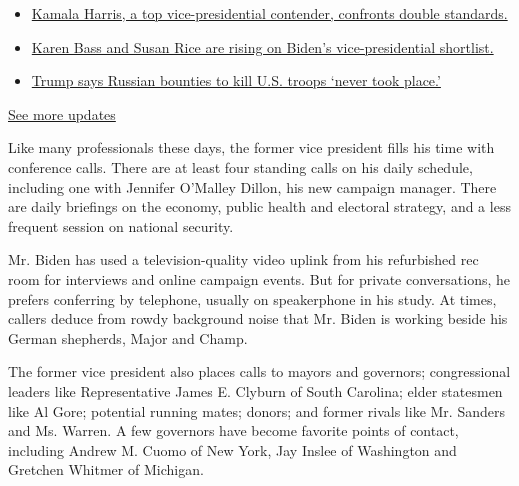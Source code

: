 \begin{itemize}
\tightlist
\item
  \href{https://www.nytimes.com/2020/07/31/us/elections/biden-vs-trump.html?action=click\&pgtype=Article\&state=default\&region=MAIN_CONTENT_1\&context=storylines_live_updates\#link-29fdff45}{Kamala
  Harris, a top vice-presidential contender, confronts double
  standards.}
\item
  \href{https://www.nytimes.com/2020/07/31/us/elections/biden-vs-trump.html?action=click\&pgtype=Article\&state=default\&region=MAIN_CONTENT_1\&context=storylines_live_updates\#link-13ec3d9c}{Karen
  Bass and Susan Rice are rising on Biden's vice-presidential
  shortlist.}
\item
  \href{https://www.nytimes.com/2020/07/31/us/elections/biden-vs-trump.html?action=click\&pgtype=Article\&state=default\&region=MAIN_CONTENT_1\&context=storylines_live_updates\#link-49e9a016}{Trump
  says Russian bounties to kill U.S. troops `never took place.'}
\end{itemize}

\href{https://www.nytimes.com/2020/07/31/us/elections/biden-vs-trump.html?action=click\&pgtype=Article\&state=default\&region=MAIN_CONTENT_1\&context=storylines_live_updates}{See
more updates}

Like many professionals these days, the former vice president fills his
time with conference calls. There are at least four standing calls on
his daily schedule, including one with Jennifer O'Malley Dillon, his new
campaign manager. There are daily briefings on the economy, public
health and electoral strategy, and a less frequent session on national
security.

Mr. Biden has used a television-quality video uplink from his
refurbished rec room for interviews and online campaign events. But for
private conversations, he prefers conferring by telephone, usually on
speakerphone in his study. At times, callers deduce from rowdy
background noise that Mr. Biden is working beside his German shepherds,
Major and Champ.

The former vice president also places calls to mayors and governors;
congressional leaders like Representative James E. Clyburn of South
Carolina; elder statesmen like Al Gore; potential running mates; donors;
and former rivals like Mr. Sanders and Ms. Warren. A few governors have
become favorite points of contact, including Andrew M. Cuomo of New
York, Jay Inslee of Washington and Gretchen Whitmer of Michigan.

